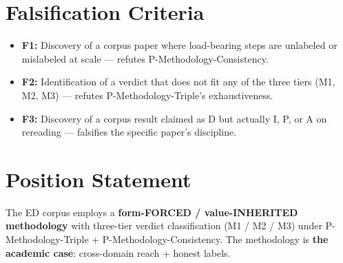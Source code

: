 \documentclass[11pt,a4paper]{article}
\begin{document}
\section{Falsification Criteria}

\begin{itemize}[noitemsep]
\item \textbf{F1:} Discovery of a corpus paper where load-bearing steps are unlabeled or mislabeled at scale --- refutes P-Methodology-Consistency.
\item \textbf{F2:} Identification of a verdict that does not fit any of the three tiers (M1, M2, M3) --- refutes P-Methodology-Triple's exhaustiveness.
\item \textbf{F3:} Discovery of a corpus result claimed as D but actually I, P, or A on rereading --- falsifies the specific paper's discipline.
\end{itemize}

\section{Position Statement}

The ED corpus employs a \textbf{form-FORCED / value-INHERITED methodology} with three-tier verdict classification (M1 / M2 / M3) under P-Methodology-Triple + P-Methodology-Consistency. The methodology is \textbf{the academic case}: cross-domain reach + honest labels.
\end{document}
